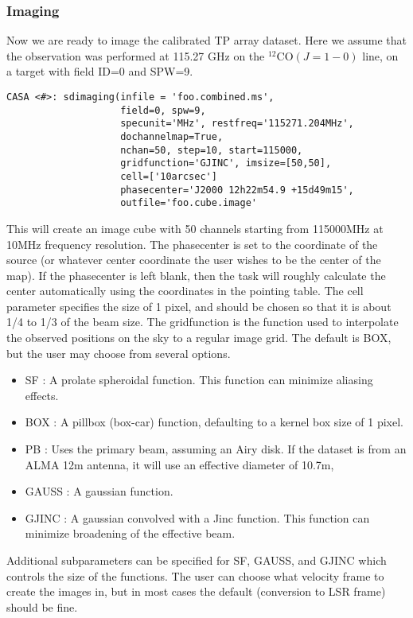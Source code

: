 \subsubsection{Imaging}
Now we are ready to image the calibrated TP array dataset.  Here we
assume that the observation was performed at 115.27 GHz on the
$^{12}\mathrm{CO}(J=1-0)$ line, on a target with field ID=0 and SPW=9.

\begin{verbatim}
CASA <#>: sdimaging(infile = 'foo.combined.ms',
                    field=0, spw=9,
                    specunit='MHz', restfreq='115271.204MHz',
                    dochannelmap=True,
                    nchan=50, step=10, start=115000,
                    gridfunction='GJINC', imsize=[50,50],
                    cell=['10arcsec']
                    phasecenter='J2000 12h22m54.9 +15d49m15',
                    outfile='foo.cube.image'
\end{verbatim}
This will create an image cube with 50 channels starting from
115000MHz at 10MHz frequency resolution.  The phasecenter is set to
the coordinate of the source (or whatever center coordinate the user
wishes to be the center of the map).  If the phasecenter is left
blank, then the task will roughly calculate the center automatically
using the coordinates in the pointing table.  The cell parameter
specifies the size of 1 pixel, and should be chosen so that it is
about 1/4 to 1/3 of the beam size.  The gridfunction is the function
used to interpolate the observed positions on the sky to a regular
image grid.  The default is BOX, but the user may choose from several
options.
\begin{itemize}
\item SF : A prolate spheroidal function.  This function can minimize aliasing effects.
\item BOX : A pillbox (box-car) function, defaulting to a kernel box size of 1 pixel.
\item PB : Uses the primary beam, assuming an Airy disk.  If the dataset is from an ALMA 12m antenna, it will use an effective diameter of 10.7m, 
\item GAUSS : A gaussian function.
\item GJINC : A gaussian convolved with a Jinc function. This function can minimize broadening of the effective beam.
\end{itemize}
Additional subparameters can be specified for SF, GAUSS, and GJINC
which controls the size of the functions.  The user can choose what
velocity frame to create the images in, but in most cases the default
(conversion to LSR frame) should be fine.


